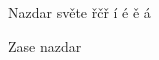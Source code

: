 \documentclass{article}
\begin{document}
Nazdar světe \v{r}\v{c}\v{r} \'i \'e \v{e} \'a


Zase nazdar
\end{document}
